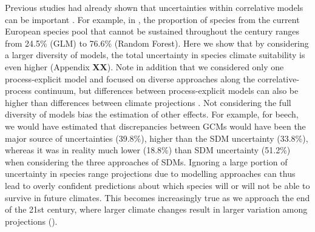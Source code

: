 \documentclass[letterpaper,8pt]{extarticle}  %
\begin{document}
\begin{doublespacing}
\begin{linenumbers}
Previous studies had already shown that uncertainties within correlative models can be important  \citep{Thuiller2019}. For example, in \citet{Wessely2024}, the proportion of species from the current European species pool that cannot be sustained throughout the century ranges from 24.5\% (GLM) to 76.6\% (Random Forest). Here we show that by considering a larger diversity of models, the total uncertainty in species climate suitability is even higher (Appendix \textbf{XX}). Note in addition that we considered only one process-explicit model and focused  on diverse approaches along the correlative-process continuum, but differences between process-explicit models can also be higher than differences between climate projections \citep{Asseng2013}. Not considering the full diversity of models  bias the estimation of other effects. For example, for beech, we would have estimated that discrepancies between GCMs would have been the major source of uncertainties (39.8\%), higher than the SDM uncertainty (33.8\%), whereas it was in reality much lower (18.8\%) than SDM uncertainty (51.2\%) when considering the three approaches of SDMs. Ignoring a large portion of uncertainty in species range projections due to modelling approaches can thus lead to overly confident predictions about which species will or will not be able to survive in future climates.  This becomes increasingly true as we approach the end of the 21st century, where larger climate changes result in larger variation among projections ().



\end{linenumbers}
\end{doublespacing}
\end{document}
